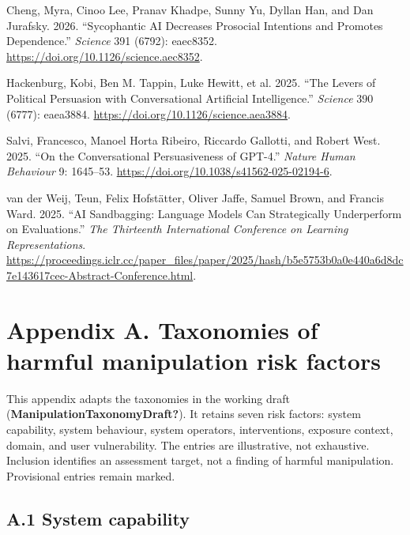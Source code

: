 \documentclass[
  english,
]{article}
\newlength{\cslhangindent}
\newenvironment{CSLReferences}[2] %
 {\begin{list}{}{%
  \setlength{\itemindent}{0pt}
  \setlength{\leftmargin}{0pt}
  \setlength{\parsep}{0pt}
  \ifodd #1
   \setlength{\leftmargin}{\cslhangindent}
   \setlength{\itemindent}{-1\cslhangindent}
  \fi
  \setlength{\itemsep}{#2\baselineskip}}}
 {\end{list}}
\begin{document}
\protect{}\label{refs}
\begin{CSLReferences}{1}{1}
Cheng, Myra, Cinoo Lee, Pranav Khadpe, Sunny Yu, Dyllan Han, and Dan
Jurafsky. 2026. {``Sycophantic {AI} Decreases Prosocial Intentions and
Promotes Dependence.''} \emph{Science} 391 (6792): eaec8352.
\url{https://doi.org/10.1126/science.aec8352}.

Hackenburg, Kobi, Ben M. Tappin, Luke Hewitt, et al. 2025. {``The Levers
of Political Persuasion with Conversational Artificial Intelligence.''}
\emph{Science} 390 (6777): eaea3884.
\url{https://doi.org/10.1126/science.aea3884}.

Salvi, Francesco, Manoel Horta Ribeiro, Riccardo Gallotti, and Robert
West. 2025. {``On the Conversational Persuasiveness of {GPT-4}.''}
\emph{Nature Human Behaviour} 9: 1645--53.
\url{https://doi.org/10.1038/s41562-025-02194-6}.

{van der Weij, Teun, Felix Hofstätter, Oliver Jaffe, Samuel Brown, and
Francis Ward}. 2025. {``{AI} Sandbagging: Language Models Can
Strategically Underperform on Evaluations.''} \emph{The Thirteenth
International Conference on Learning Representations}.
\url{https://proceedings.iclr.cc/paper_files/paper/2025/hash/b5e5753b0a0e440a6d8dc7e143617cec-Abstract-Conference.html}.

\end{CSLReferences}

\section*{Appendix A. Taxonomies of harmful manipulation risk
factors}\label{appendix-taxonomies}

This appendix adapts the taxonomies in the working draft
(\textbf{ManipulationTaxonomyDraft?}). It retains seven risk factors:
system capability, system behaviour, system operators, interventions,
exposure context, domain, and user vulnerability. The entries are
illustrative, not exhaustive. Inclusion identifies an assessment target,
not a finding of harmful manipulation. Provisional entries remain
marked.

\subsection*{A.1 System capability}\label{a.1-system-capability}
\end{document}
